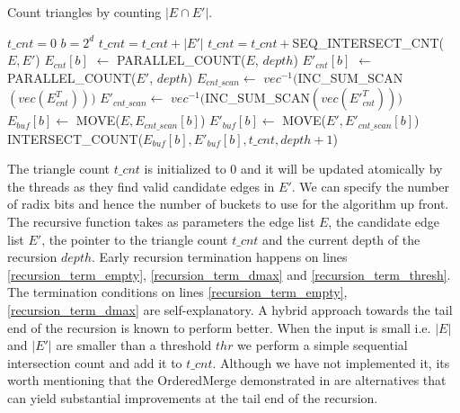 \documentclass[conference]{IEEEtran}
\begin{document}
\begin{algorithm}
  \caption{Count triangles by counting $|E \cap E'|$.\label{tri_count}}
  \begin{algorithmic}[1]
    \Statex
    \State $t\_cnt = 0$ 
    \State $b=2^d$ 
	\State \Return{}
      \EndIf
	\State $t\_cnt = t\_cnt + |E'|$
	\State \Return{}
      \EndIf
	\State $t\_cnt = t\_cnt +$SEQ\_INTERSECT\_CNT($E, E'$)
	\State \Return{}
      \EndIf
      \State $E_{cnt}[b]$ $\gets$ PARALLEL\_COUNT($E$, $depth$) \label{par_cnt_e}
      \State $E'_{cnt}[b]$ $\gets$ PARALLEL\_COUNT($E'$, $depth$) \label{par_cnt_e_prime}
      \State $E_{cnt\_scan} \gets$ $vec^{-1}($INC\_SUM\_SCAN$(vec(E_{cnt}^T)))$ \label{inc_sum_scan_e_cnt}
      \State $E'_{cnt\_scan} \gets$ $vec^{-1}($INC\_SUM\_SCAN$(vec(E'_{cnt}^T)))$ \label{inc_sum_scan_e_prime_cnt}
	\State $E_{buf}[b] \gets$ MOVE($E, E_{cnt\_scan}[b]$) \label{move_e_cnt_scan}
      \EndFor
	\State $E'_{buf}[b] \gets$ MOVE($E', E'_{cnt\_scan}[b]$) \label{move_e_prime_cnt_scan}
      \EndFor
	\State INTERSECT\_COUNT($E_{buf}[b], E'_{buf}[b], t\_cnt, depth+1$) \label{recursion_call}
      \EndFor
    \EndFunction
  \end{algorithmic}
\end{algorithm}

The triangle count $t\_cnt$ is initialized to 0 and it will be updated atomically by the threads as they find valid candidate edges in $E'$. We can specify the number of radix bits and hence the number of buckets to use for the algorithm up front. The recursive function takes as parameters the edge list $E$, the candidate edge list $E'$, the pointer to the triangle count $t\_cnt$ and the current depth of the recursion $depth$. Early recursion termination happens on lines \ref{recursion_term_empty}, \ref{recursion_term_dmax} and \ref{recursion_term_thresh}. The termination conditions on lines \ref{recursion_term_empty}, \ref{recursion_term_dmax} are self-explanatory. A hybrid approach towards the tail end of the recursion is known to perform better\cite{b16}. When the input is small i.e. $|E|$ and $|E'|$ are smaller than a threshold $thr$ we perform a simple sequential intersection count and add it to $t\_cnt$. Although we have not implemented it, its worth mentioning that the OrderedMerge demonstrated in \cite{b17, b18} are alternatives that can yield substantial improvements at the tail end of the recursion.
\end{document}
